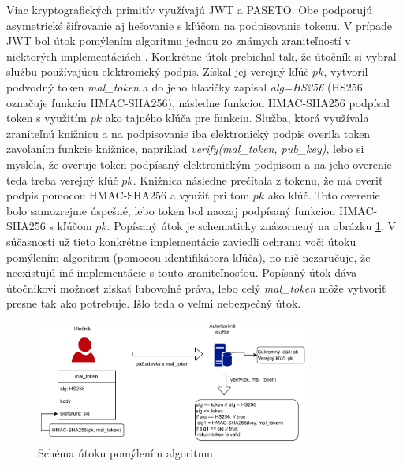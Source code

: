 Viac kryptografických primitív využívajú JWT a PASETO. Obe podporujú asymetrické šifrovanie aj hešovanie s kľúčom na podpisovanie tokenu. V prípade JWT bol útok pomýlením algoritmu jednou zo známych zraniteľností v niektorých implementáciách \cite{jwt_vul}. Konkrétne útok prebiehal tak, že útočník si vybral službu používajúcu elektronický podpis. Získal jej verejný kľúč $pk$, vytvoril podvodný token \textit{mal\_token} a do jeho hlavičky zapísal \textit{alg=HS256} (HS256 označuje funkciu HMAC-SHA256), následne funkciou HMAC-SHA256 podpísal token s využitím $pk$ ako tajného kľúča pre funkciu. Služba, ktorá využívala zraniteľnú knižnicu a na podpisovanie iba elektronický podpis overila token zavolaním funkcie knižnice, napríklad \textit{verify(mal\_token, pub\_key)}, lebo si myslela, že overuje token podpísaný elektronickým podpisom a na jeho overenie teda treba verejný kľúč $pk$. Knižnica následne prečítala z tokenu, že má overiť podpis pomocou HMAC-SHA256 a využiť pri tom $pk$ ako kľúč. Toto overenie bolo samozrejme úspešné, lebo token bol naozaj podpísaný funkciou HMAC-SHA256 s kľúčom $pk$. Popísaný útok je schematicky znázornený na obrázku \ref{fig:conf_alg_attack}. V súčasnosti už tieto konkrétne implementácie zaviedli ochranu voči útoku pomýlením algoritmu (pomocou identifikátora kľúča), no nič nezaručuje, že neexistujú iné implementácie s touto zraniteľnosťou. Popísaný útok dáva útočníkovi možnosť získať ľubovoľné práva, lebo celý \textit{mal\_token} môže vytvoriť presne tak ako potrebuje. Išlo teda o veľmi nebezpečný útok.

\begin{figure}
  \centerline{\includegraphics[width=0.8\textwidth]{images/conf_alg_attack}}
  \caption[Útok pomýlením algortimu]{Schéma útoku pomýlením algoritmu \cite{jwt_vul}.}
  \label{fig:conf_alg_attack}
\end{figure}

